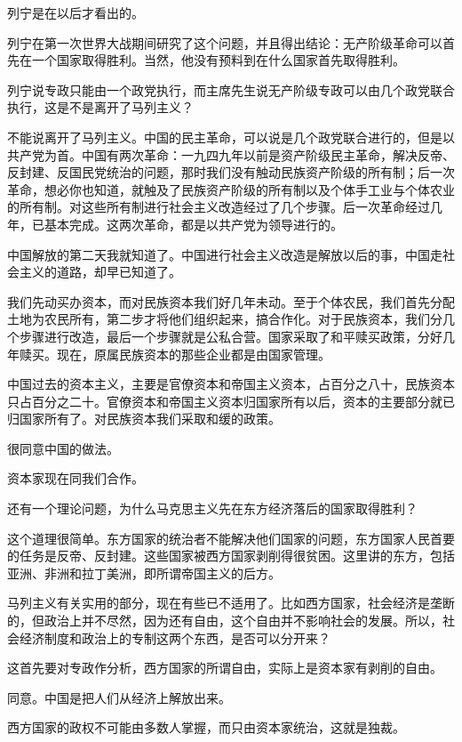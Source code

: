 列宁是在以后才看出的。

列宁在第一次世界大战期间研究了这个问题，并且得出结论：无产阶级革命可以首先在一个国家取得胜利。当然，他没有预料到在什么国家首先取得胜利。

列宁说专政只能由一个政党执行，而主席先生说无产阶级专政可以由几个政党联合执行，这是不是离开了马列主义？

不能说离开了马列主义。中国的民主革命，可以说是几个政党联合进行的，但是以共产党为首。中国有两次革命：一九四九年以前是资产阶级民主革命，解决反帝、反封建、反国民党统治的问题，那时我们没有触动民族资产阶级的所有制；后一次革命，想必你也知道，就触及了民族资产阶级的所有制以及个体手工业与个体农业的所有制。对这些所有制进行社会主义改造经过了几个步骤。后一次革命经过几年，已基本完成。这两次革命，都是以共产党为领导进行的。

中国解放的第二天我就知道了。中国进行社会主义改造是解放以后的事，中国走社会主义的道路，却早已知道了。

我们先动买办资本，而对民族资本我们好几年未动。至于个体农民，我们首先分配土地为农民所有，第二步才将他们组织起来，搞合作化。对于民族资本，我们分几个步骤进行改造，最后一个步骤就是公私合营。国家采取了和平赎买政策，分好几年赎买。现在，原属民族资本的那些企业都是由国家管理。

中国过去的资本主义，主要是官僚资本和帝国主义资本，占百分之八十，民族资本只占百分之二十。官僚资本和帝国主义资本归国家所有以后，资本的主要部分就已归国家所有了。对民族资本我们采取和缓的政策。

很同意中国的做法。

资本家现在同我们合作。

还有一个理论问题，为什么马克思主义先在东方经济落后的国家取得胜利？

这个道理很简单。东方国家的统治者不能解决他们国家的问题，东方国家人民首要的任务是反帝、反封建。这些国家被西方国家剥削得很贫困。这里讲的东方，包括亚洲、非洲和拉丁美洲，即所谓帝国主义的后方。

马列主义有关实用的部分，现在有些已不适用了。比如西方国家，社会经济是垄断的，但政治上并不尽然，因为还有自由，这个自由并不影响社会的发展。所以，社会经济制度和政治上的专制这两个东西，是否可以分开来？

这首先要对专政作分析，西方国家的所谓自由，实际上是资本家有剥削的自由。

同意。中国是把人们从经济上解放出来。

西方国家的政权不可能由多数人掌握，而只由资本家统治，这就是独裁。

